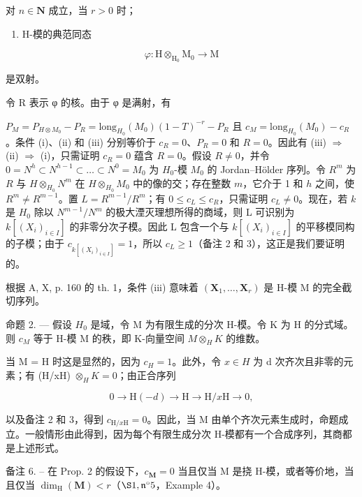对 \(n \in \mathbf{N}\) 成立，当 \(r > 0\) 时；

\begin{enumerate}
\def\labelenumi{(\roman{enumi})}
\setcounter{enumi}{2}
\tightlist
\item
  H-模的典范同态
\end{enumerate}

\[
\varphi : \mathrm{H} \otimes_ {\mathrm{H} _ {0}} \mathrm{M} _ {0} \rightarrow \mathrm{M}
\]

是双射。

令 R 表示 φ 的核。由于 φ 是满射，有

\(P_{M} = P_{H \otimes M_{0}} - P_{R} = \text{long}_{H_{0}}(M_{0})(1 - T)^{-r} - P_{R}\) 且 \(c_{M} = \text{long}_{H_{0}}(M_{0}) - c_{R}\)。条件 (i)、(ii) 和 (iii) 分别等价于 \(c_{R} = 0\)、\(P_{R} = 0\) 和 \(R = 0\)。因此有 (iii) \(\Rightarrow\) (ii) \(\Rightarrow\) (i)，只需证明 \(c_{R} = 0\) 蕴含 \(R = 0\)。假设 \(R \neq 0\)，并令 \(0 = N^{h} \subset N^{h-1} \subset \ldots \subset N^{0} = M_{0}\) 为 \(H_{0}\)-模 \(M_{0}\) 的 Jordan–Hölder 序列。令 \(R^{m}\) 为 \(R\) 与 \(H \otimes_{H_{0}} N^{m}\) 在 \(H \otimes_{H_{0}} M_{0}\) 中的像的交；存在整数 \(m\)，它介于 1 和 \(h\) 之间，使 \(R^{m} \neq R^{m-1}\)。置 \(L = R^{m-1}/R^{m}\)；有 \(0 \leqslant c_{L} \leqslant c_{R}\)，只需证明 \(c_{L} \neq 0\)。现在，若 \(k\) 是 \(H_{0}\) 除以 \(N^{m-1}/N^{m}\) 的极大湮灭理想所得的商域，则 L 可识别为 \(k[(X_{i})_{i\in I}]\) 的非零分次子模。因此 L 包含一个与 \(k[(X_{i})_{i\in I}]\) 的平移模同构的子模；由于 \(c_{k[(X_{i})_{i\in I}]} = 1\)，所以 \(c_{L} \geqslant 1\)（备注 2 和 3），这正是我们要证明的。

根据 A, X, p. 160 的 th. 1，条件 (iii) 意味着 \((\mathbf{X}_{1}, \ldots, \mathbf{X}_{r})\) 是 H-模 M 的完全截切序列。

命题 2. --- 假设 \(H_{0}\) 是域，令 M 为有限生成的分次 H-模。令 K 为 H 的分式域。则 \(c_{M}\) 等于 H-模 M 的秩，即 K-向量空间 \(M \otimes_{H} K\) 的维数。

当 M = H 时这是显然的，因为 \(c_{H} = 1\)。此外，令 \(x \in H\) 为 d 次齐次且非零的元素；有 (H/xH) \(\otimes_{H} K = 0\)；由正合序列

\[
0 \rightarrow \mathrm{H} (- d) \rightarrow \mathrm{H} \rightarrow \mathrm{H} / x \mathrm{H} \rightarrow 0,
\]

以及备注 2 和 3，得到 \(c_{\mathrm{H}/x\mathrm{H}}=0\)。因此，当 M 由单个齐次元素生成时，命题成立。一般情形由此得到，因为每个有限生成分次 H-模都有一个合成序列，其商都是上述形式。

备注 6. -- 在 Prop. 2 的假设下，\(c_{\mathbf{M}} = 0\) 当且仅当 M 是挠 H-模，或者等价地，当且仅当 \(\dim_{\mathrm{H}}(\mathbf{M}) < r\)（\(\S 1, \mathfrak{n}^{\circ} 5\)，Example 4）。

